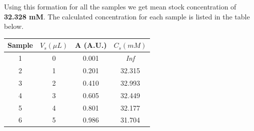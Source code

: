\documentclass[a4paper,10pt]{article}
\begin{document}
            \noindent Using this formation for all the samples we get mean stock concentration of 
            {\bfseries 32.328 mM}. The calculated concentration for each sample is listed 
            in the table below.
            
            \begin{center}
                \begin{tabular}{c | c c c}
                    Sample & $ V_s (\mu L) $ & A (A.U.) & $ C_s (mM) $ \\
                    \hline\hline
                    1 & 0 & 0.001 & {\it Inf} \\
                    2 & 1 & 0.201 & 32.315 \\
                    3 & 2 & 0.410 & 32.993 \\
                    4 & 3 & 0.605 & 32.449 \\
                    5 & 4 & 0.801 & 32.177 \\
                    6 & 5 & 0.986 & 31.704 \\
                \end{tabular}
            \end{center}
    \pagebreak
\end{document}
